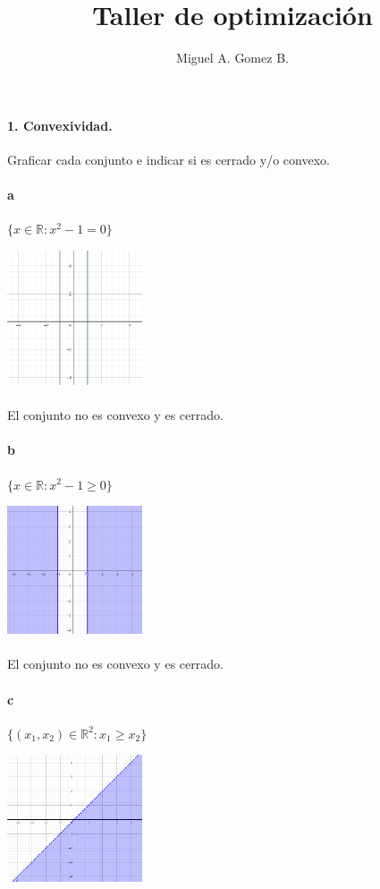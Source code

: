 \documentclass{article}
\title{Taller de optimización}
\author{Miguel A. Gomez B.}
\begin{document}
	
	\maketitle
	\paragraph{1. Convexividad.} Graficar cada conjunto e indicar si es cerrado y/o convexo.
	\paragraph{a} $\{ x \in \mathbb{R}: x^2 - 1 = 0 \}$
	\begin{center}
		\includegraphics[width=0.3\textwidth]{a}
	\end{center}
	\paragraph{}El conjunto no es convexo y es cerrado.
	\paragraph{b} $\{ x \in \mathbb{R}: x^2 - 1 \geq 0 \}$
	\begin{center}
		\includegraphics[width=0.3\textwidth]{b}
	\end{center}
	\paragraph{}El conjunto no es convexo y es cerrado.
	\newpage
	\paragraph{c} $\{ (x_1,x_2) \in \mathbb{R}^2: x_1 \geq x_2 \}$
	\begin{center}
		\includegraphics[width=0.3\textwidth]{c}
	\end{center}
\end{document}
